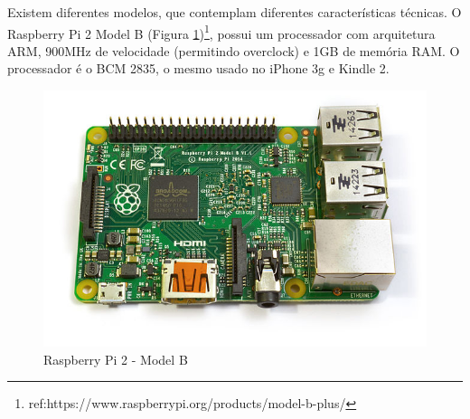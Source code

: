 Existem diferentes modelos, que contemplam diferentes características
técnicas. O Raspberry Pi 2 Model B (Figura \ref{fig:raspberry})\footnote{ref:https://www.raspberrypi.org/products/model-b-plus/},
possui um processador com arquitetura ARM, 900MHz de velocidade (permitindo
overclock) e 1GB de memória RAM. O processador é o BCM 2835, o mesmo
usado no iPhone 3g e Kindle 2. 

\begin{figure}[h]
\begin{centering}
\includegraphics[width=0.8\linewidth]{Imagens/Cap_2/Raspberry_Pi_B}
\par\end{centering}
\caption{Raspberry Pi 2 - Model B \cite{img:raspberry} \label{fig:raspberry}}
\end{figure}



